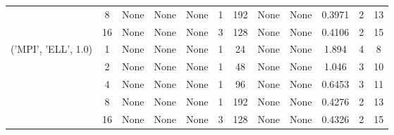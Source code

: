 \begin{tabular}{cccccccccccc}
& 8& None& None& None& 1& 192& None& None& 0.3971& 2& 13\\
& 16& None& None& None& 3& 128& None& None& 0.4106& 2& 15\\
\hline
\multirow{5}{*}{('MPI', 'ELL', 1.0)}& 1& None& None& None& 1& 24& None& None& 1.894& 4& 8\\
& 2& None& None& None& 1& 48& None& None& 1.046& 3& 10\\
& 4& None& None& None& 1& 96& None& None& 0.6453& 3& 11\\
& 8& None& None& None& 1& 192& None& None& 0.4276& 2& 13\\
& 16& None& None& None& 3& 128& None& None& 0.4326& 2& 15\\
\hline
\end{tabular}
